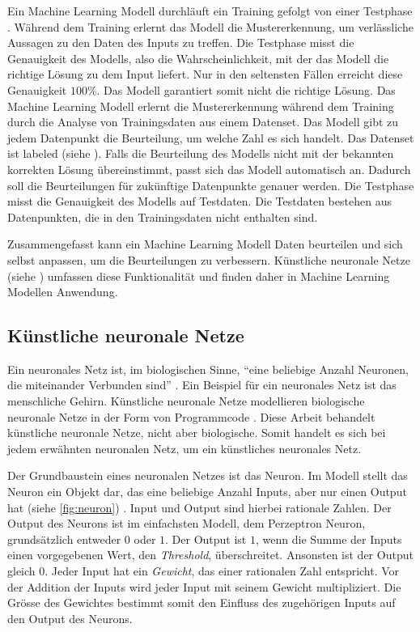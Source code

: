 Ein Machine Learning Modell durchläuft ein Training gefolgt von einer Testphase
\cite{noauthor_training_nodate}. Während dem Training erlernt das Modell die
Mustererkennung, um verlässliche Aussagen zu den Daten des Inputs zu treffen.
Die Testphase misst die Genauigkeit des Modells, also die Wahrscheinlichkeit,
mit der das Modell die richtige Lösung zu dem Input liefert. Nur in den seltensten
Fällen erreicht diese Genauigkeit $100\%$. Das Modell garantiert somit nicht die
richtige Lösung. Das Machine Learning Modell erlernt die Mustererkennung während
dem Training durch die Analyse von Trainingsdaten aus einem Datenset. Das Modell
gibt zu jedem Datenpunkt die Beurteilung, um welche Zahl es sich handelt. Das
Datenset ist labeled (siehe ). Falls die Beurteilung des
Modells nicht mit der bekannten korrekten Lösung übereinstimmt, passt sich das
Modell automatisch an. Dadurch soll die Beurteilungen für zukünftige Datenpunkte
genauer werden. Die Testphase misst die Genauigkeit des Modells auf Testdaten.
Die Testdaten bestehen aus Datenpunkten, die in den Trainingsdaten nicht
enthalten sind.
 
Zusammengefasst kann ein Machine Learning Modell Daten beurteilen und sich
selbst anpassen, um die Beurteilungen zu verbessern. Künstliche neuronale Netze
(siehe ) umfassen diese Funktionalität und finden daher in
Machine Learning Modellen Anwendung.
 
\subsection{Künstliche neuronale Netze}\label{sub:t_ml_nn} Ein neuronales Netz
ist, im biologischen Sinne, ``eine beliebige Anzahl Neuronen, die miteinander
Verbunden sind'' \cite{noauthor_neuronales_2021}. Ein Beispiel für ein neuronales
Netz ist das menschliche Gehirn. Künstliche neuronale Netze modellieren
biologische neuronale Netze in der Form von Programmcode
\cite{noauthor_artificial_nodate}. Diese Arbeit behandelt künstliche neuronale
Netze, nicht aber biologische. Somit handelt es sich bei jedem erwähnten
neuronalen Netz, um ein künstliches neuronales Netz.
 
Der Grundbaustein eines neuronalen Netzes ist das Neuron. Im Modell stellt das
Neuron ein Objekt dar, das eine beliebige Anzahl Inputs, aber nur einen Output
hat (siehe \autoref{fig:neuron}) \cite{pramoditha_concept_2021}. Input und
Output sind hierbei rationale Zahlen. Der Output des Neurons ist im einfachsten
Modell, dem Perzeptron Neuron, grundsätzlich entweder $0$ oder $1$. Der Output ist
$1$, wenn die Summe der Inputs einen vorgegebenen Wert, den \emph{Threshold},
überschreitet. Ansonsten ist der Output gleich $0$. Jeder Input hat ein
\emph{Gewicht}, das einer rationalen Zahl entspricht. Vor der Addition der
Inputs wird jeder Input mit seinem Gewicht multipliziert. Die Grösse des
Gewichtes bestimmt somit den Einfluss des zugehörigen Inputs auf den Output des
Neurons. \cite{nielsen_neural_2015}\cite{simplilearn_what_2021}



